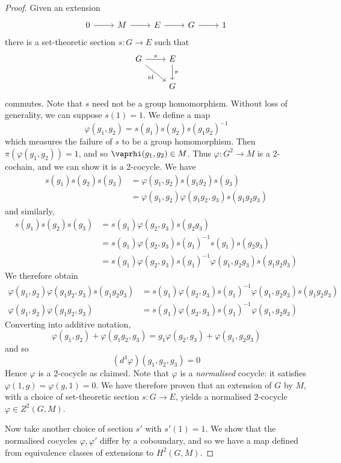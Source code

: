 \begin{proof}
    Given an extension
\[\begin{tikzcd}
	0 & M & E & G & 1
	\arrow[from=1-1, to=1-2]
	\arrow[from=1-2, to=1-3]
	\arrow[from=1-3, to=1-4]
	\arrow[from=1-4, to=1-5]
\end{tikzcd}\]
    there is a set-theoretic section \( s : G \to E \) such that
\[\begin{tikzcd}
	G & E \\
	& G
	\arrow["s", from=1-1, to=1-2]
	\arrow["\pi", from=1-2, to=2-2]
	\arrow["\id"', from=1-1, to=2-2]
\end{tikzcd}\]
    commutes.
    Note that \( s \) need not be a group homomorphism.
    Without loss of generality, we can suppose \( s(1) = 1 \).
    We define a map
    \[ \varphi(g_1, g_2) = s(g_1)s(g_2)s(g_1 g_2)^{-1} \]
    which measures the failure of \( s \) to be a group homomorphism.
    Then \( \pi(\varphi(g_1, g_2)) = 1 \), and so \( \vaprhi(g_1, g_2) \in M \).
    Thus \( \varphi : G^2 \to M \) is a 2-cochain, and we can show it is a 2-cocycle.
    We have
    \begin{align*}
        s(g_1) s(g_2) s(g_3) &= \varphi(g_1, g_2) s(g_1 g_2) s(g_3) \\
        &= \varphi(g_1, g_2) \varphi(g_1 g_2, g_3) s(g_1 g_2 g_3)
    \end{align*}
    and similarly,
    \begin{align*}
        s(g_1) s(g_2) s(g_3) &= s(g_1) \varphi(g_2, g_3) s(g_2 g_3) \\
        &= s(g_1) \varphi(g_2, g_3) s(g_1)^{-1} s(g_1) s(g_2 g_3) \\
        &= s(g_1) \varphi(g_2, g_3) s(g_1)^{-1} \varphi(g_1, g_2 g_3) s(g_1 g_2 g_3)
    \end{align*}
    We therefore obtain
    \begin{align*}
        \varphi(g_1, g_2) \varphi(g_1 g_2, g_3) s(g_1 g_2 g_3) &= s(g_1) \varphi(g_2, g_3) s(g_1)^{-1} \varphi(g_1, g_2 g_3) s(g_1 g_2 g_3) \\
        \varphi(g_1, g_2) \varphi(g_1 g_2, g_3) &= s(g_1) \varphi(g_2, g_3) s(g_1)^{-1} \varphi(g_1, g_2 g_3)
    \end{align*}
    Converting into additive notation,
    \[ \varphi(g_1, g_2) + \varphi(g_1 g_2, g_3) = g_1 \varphi(g_2, g_3) + \varphi(g_1, g_2 g_3) \]
    and so
    \[ (d^3 \varphi)(g_1, g_2, g_3) = 0 \]
    Hence \( \varphi \) is a 2-cocycle as claimed.
    Note that \( \varphi \) is a \emph{normalised} cocycle: it satisfies \( \varphi(1, g) = \varphi(g, 1) = 0 \).
    We have therefore proven that an extension of \( G \) by \( M \), with a choice of set-theoretic section \( s : G \to E \), yields a normalised 2-cocycle \( \varphi \in Z^2(G, M) \).

    Now take another choice of section \( s' \) with \( s'(1) = 1 \).
    We show that the normalised cocycles \( \varphi, \varphi' \) differ by a coboundary, and so we have a map defined from equivalence classes of extensions to \( H^2(G, M) \).
\end{proof}
